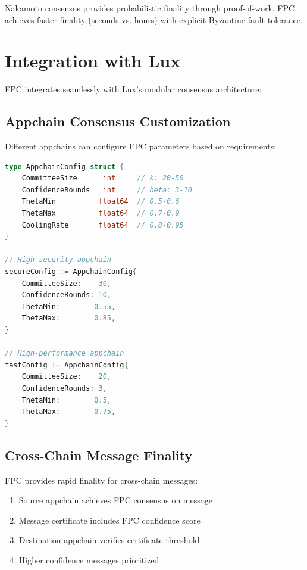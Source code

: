 \documentclass[11pt,a4paper]{article}
\begin{document}
Nakamoto consensus provides probabilistic finality through proof-of-work. FPC achieves faster finality (seconds vs. hours) with explicit Byzantine fault tolerance.

\section{Integration with Lux}
\label{sec:integration}

FPC integrates seamlessly with Lux's modular consensus architecture:

\subsection{Appchain Consensus Customization}

Different appchains can configure FPC parameters based on requirements:

\begin{lstlisting}[language=Go, caption=Appchain-specific FPC configuration]
type AppchainConfig struct {
    CommitteeSize      int     // k: 20-50
    ConfidenceRounds   int     // beta: 3-10
    ThetaMin          float64  // 0.5-0.6
    ThetaMax          float64  // 0.7-0.9
    CoolingRate       float64  // 0.8-0.95
}

// High-security appchain
secureConfig := AppchainConfig{
    CommitteeSize:    30,
    ConfidenceRounds: 10,
    ThetaMin:        0.55,
    ThetaMax:        0.85,
}

// High-performance appchain  
fastConfig := AppchainConfig{
    CommitteeSize:    20,
    ConfidenceRounds: 3,
    ThetaMin:        0.5,
    ThetaMax:        0.75,
}
\end{lstlisting}

\subsection{Cross-Chain Message Finality}

FPC provides rapid finality for cross-chain messages:

\begin{enumerate}
\item Source appchain achieves FPC consensus on message
\item Message certificate includes FPC confidence score
\item Destination appchain verifies certificate threshold
\item Higher confidence messages prioritized
\end{enumerate}
\end{document}
